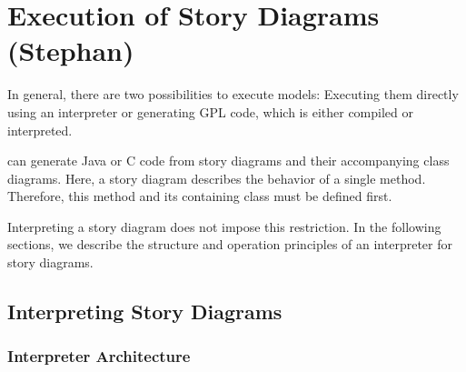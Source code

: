 \chapter{Execution of Story Diagrams (Stephan)} \label{sec:Execution}

In general, there are two possibilities to execute models: Executing them directly using an interpreter \cite{GHS09} or generating GPL code, which is either compiled or interpreted.

\fuj can generate Java or C code from story diagrams and their accompanying class diagrams. 
Here, a story diagram describes the behavior of a single method. 
Therefore, this method and its containing class must be defined first.

Interpreting a story diagram does not impose this restriction.
In the following sections, we describe the structure and operation principles of an interpreter for story diagrams.


\section{Interpreting Story Diagrams}
\label{sec:InterpretingStoryDiagrams}

\subsection{Interpreter Architecture}

